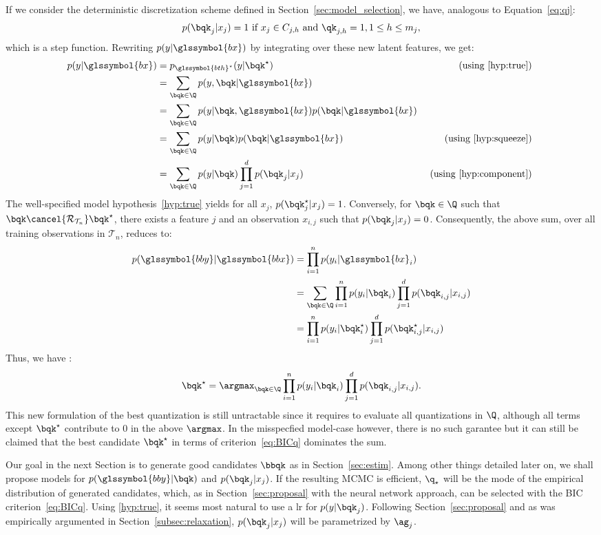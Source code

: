 If we consider the deterministic discretization scheme defined in Section~\ref{sec:model_selection}, we have, analogous to Equation~\eqref{eq:qj}:
$$
p(\bqk_j | x_j) = 1 \text{ if } x_j \in C_{j,h} \text{ and } \qk_{j,h} = 1, 1 \leq h \leq m_j,
$$
which is a step function. Rewriting $p(y| \glssymbol{bx})$ by integrating over these new latent features,
we get:
\begin{align*}
p(y | \glssymbol{bx}) & = p_{\glssymbol{bth}^\star}(y | \bqk^\star) & \text{ (using \eqref{hyp:true}) } \\
& = \sum_{\bqk \in \Q} p(y, \bqk | \glssymbol{bx}) \\
& = \sum_{\bqk \in \Q} p(y | \bqk, \glssymbol{bx}) p(\bqk | \glssymbol{bx}) \\
& = \sum_{\bqk \in \Q} p(y | \bqk) p(\bqk | \glssymbol{bx}) & \text{ (using \eqref{hyp:squeeze}) } \\
& = \sum_{\bqk \in \Q} p(y | \bqk) \prod_{j=1}^d p(\bqk_j | x_j) & \text{ (using \eqref{hyp:component}) }
\end{align*}
The well-specified model hypothesis~\eqref{hyp:true} yields for all $x_j$, $p(\bqk_j^\star | x_j) = 1$. Conversely, for $\bqk \in \Q$ such that $\bqk \cancel{\mathcal{R}_{\mathcal{T}_n}} \bqk^\star$, there exists a feature $j$ and an observation $x_{i,j}$ such that $p(\bqk_j | x_j) = 0$. Consequently, the above sum, over all training observations in $\mathcal{T}_n$, reduces to:
\begin{align*}
p(\glssymbol{bby} | \glssymbol{bbx}) & = \prod_{i=1}^n p(y_i | \glssymbol{bx}_i) \\
 & = \sum_{\bqk \in \Q} \prod_{i=1}^n p(y_i | \bqk_i) \prod_{j=1}^d p(\bqk_{i,j} | x_{i,j}) \\
 & = \prod_{i=1}^n p(y_i | \bqk_i^\star) \prod_{j=1}^d p(\bqk_{i,j}^\star | x_{i,j})
\end{align*}
Thus, we have :
\[ \bqk^\star = \argmax_{\bqk \in \Q} \prod_{i=1}^n p(y_i | \bqk_i ) \prod_{j=1}^d p(\bqk_{i,j} | x_{i,j}). \]
This new formulation of the best quantization is still untractable since it requires to evaluate all quantizations in $\Q$, although all terms except $\bqk^\star$ contribute to $0$ in the above $\argmax$. In the misspecfied model-case however, there is no such garantee but it can still be claimed that the best candidate $\bqk^\star$ in terms of criterion~\eqref{eq:BICq} dominates the sum.

Our goal in the next Section is to generate good candidates $\bbqk$ as in Section~\ref{sec:estim}. Among other things detailed later on, we shall propose models for $p(\glssymbol{bby} | \bqk)$ and $p(\bqk_j | x_j)$. If the resulting MCMC is efficient, $\q_\star$ will be the mode of the empirical distribution of generated candidates, which, as in Section~\ref{sec:proposal} with the neural network approach, can be selected with the BIC criterion~\eqref{eq:BICq}. Using \eqref{hyp:true}, it seems most natural to use a \gls{lr} for $p( y | \bqk_j)$. Following Section~\ref{sec:proposal} and as was empirically argumented in Section~\ref{subsec:relaxation}, $p(\bqk_j | x_j)$ will be parametrized by $\ag_j$. 

